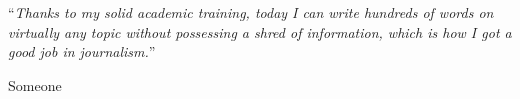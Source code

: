 % 

\renewcommand{\headrulewidth}{0pt}

\begin{declaration}
    \lipsum[17]
\end{declaration}

\cleardoublepage

\vspace*{0.2\textheight}

\noindent\enquote{\itshape Thanks to my solid academic training, today I can write hundreds of words on virtually any topic without possessing a shred of information, which is how I got a good job in journalism.}\bigbreak

\hfill Someone